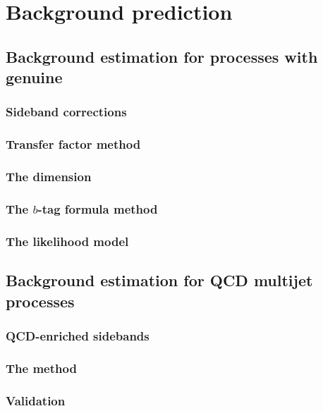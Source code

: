 \chapter{Background prediction}
\label{chap:backgroundPred}

\section{Background estimation for processes with genuine \MET}

\subsection{Sideband corrections}

\subsection{Transfer factor method}

\subsection{The \MHT dimension}

\subsection{The $b$-tag formula method}

\subsection{The likelihood model}

\section{Background estimation for QCD multijet processes}

\subsection{QCD-enriched sidebands}

\subsection{The method}

\subsection{Validation}

